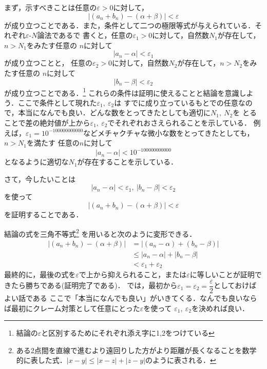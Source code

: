 \documentclass[a4paper,12pt,autodetect-engine,dvipdfmx]{jsarticle}
\theoremstyle{definition}
\begin{document}
まず，示すべきことは任意の$\varepsilon > 0$に対して，
$$\left|(a_{n} + b_{n}) - (\alpha + \beta)\right| < \varepsilon$$
が成り立つことである．また，条件として二つの極限等式が与えられている．それぞれ$\varepsilon$-$N$論法であるで
書くと，任意の$\varepsilon_{1} > 0$に対して，自然数$N_{1}$が存在して，$n>N_{1}$をみたす任意の
$n$に対して
\begin{equation*}
    \left|a_{n} - \alpha\right| < \varepsilon_{1}
\end{equation*}
が成り立つことと，
任意の$\varepsilon_{2} >0$に対して，自然数$N_{2}$が存在して，$n>N_{2}$をみたす任意の
$n$に対して
\begin{equation*}
    \left|b_{n} - \beta\right| < \varepsilon_{2}
\end{equation*}
が成り立つことである．\footnote{結論の$\varepsilon$と区別するためにそれぞれ添え字に1,2をつけている}
これらの条件は証明に使えることと結論を意識しよう．ここで条件として現れた$\varepsilon_{1},\ \varepsilon_{2}$は
すでに成り立っているもとでの任意なので，本当になんでも良い．どんな数をとってきたとしても適切に$N_{1},\ N_{2}$を
とることで差の絶対値が上から$\varepsilon_{1},\ \varepsilon_{2}$でそれぞれおさえられることを示している．
例えば，$\varepsilon_{1}=10^{-100000000000}$などメチャクチャな微小な数をとってきたとしても，$n>N_{1}$を満たす
任意の$n$に対して
$$|a_{n} - \alpha| < 10^{-100000000000}$$
となるように適切な$N_{1}$が存在することを示している．

さて，今したいことは
$$\left|a_{n} - \alpha\right| < \varepsilon_{1},\ \left|b_{n} - \beta\right| < \varepsilon_{2}$$
を使って
$$\left|(a_{n} + b_{n}) - (\alpha + \beta)\right| < \varepsilon$$
を証明することである．

結論の式を三角不等式\footnote{ある2点間を直線で進むより遠回りした方がより距離が長くなることを数学的に表した式．$|x-y|\leq |x-z|+|z-y|$のように表される．}
を用いると次のように変形できる．
\begin{align*}
    \left|(a_{n} + b_{n}) - (\alpha + \beta)\right| &= \left|(a_{n}- \alpha) + (b_{n} - \beta)\right|\\
                                                    &\leq |a_{n} - \alpha| + |b_{n} - \beta|\\
                                                    &< \varepsilon_{1} + \varepsilon_{2}
\end{align*}
最終的に，最後の式を$\varepsilon$で上から抑えられること，または$\varepsilon$に等しいことが証明できたら勝ちである(証明完了である)．
では，最初から$\varepsilon_{1} = \varepsilon_{2} = \dfrac{\varepsilon}{2}$としておけばよい話である
ここで「本当になんでも良い」がいきてくる．なんでも良いならば最初にクレーム対策として任意にとった$\varepsilon$を使って
$\varepsilon_{1},\ \varepsilon_{2}$を決めれば良い．
\end{document}
